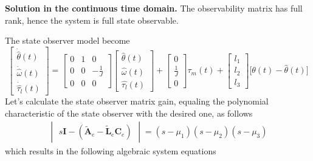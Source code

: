 \documentclass[11pt,a4paper,oneside]{book}
\numberwithin{equation}{section}
\theoremstyle{it}
\theoremstyle{definition}
\begin{document}
	\textbf{Solution in the continuous time domain.}
	The observability matrix has full rank, hence the system is full state observable.
	
	The state observer model become 
	\begin{equation} \label{example_1_eq9}
		\begin{bmatrix}
			\dot{\hat{\theta}}(t) \\[6pt]
			\dot{\hat{\omega}}(t) \\[6pt]
			\dot{\hat{\tau_l}}(t) 
		\end{bmatrix}=
		\begin{bmatrix}
			0 & 1 & 0 \\[6pt]
			0 & 0 & -\frac{1}{J} \\[6pt]
			0 & 0 & 0
		\end{bmatrix}
		\begin{bmatrix}
			\hat{\theta}(t) \\[6pt]
			\hat{\omega}(t) \\[6pt]
			\hat{\tau_l}(t) 
		\end{bmatrix}+
		\begin{bmatrix}
			0 \\[6pt]
			\frac{1}{J} \\[6pt]
			0 
		\end{bmatrix}\tau_m(t)+
		\begin{bmatrix}
			l_1 \\[6pt]
			l_2 \\[6pt]
			l_3 
		\end{bmatrix}\Big[\theta(t)-\hat{\theta}(t)\Big]
	\end{equation} 
	Let's calculate the state observer matrix gain, equaling the polynomial characteristic of the state observer with the desired one, as follows
	\begin{equation} \label{example_1_eq10}
		\begin{aligned}
			\begin{vmatrix}
				s\mathbf{I}-(\tilde{\mathbf{A}}_e-\tilde{\mathbf{L}}_e\mathbf{C}_e)
			\end{vmatrix}
			=  (s-\mu_1)(s-\mu_2)(s-\mu_3)
		\end{aligned}
	\end{equation}
	which results in the following algebraic system equations
\end{document}
